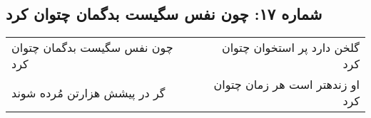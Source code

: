 \begin{center}
\section*{شماره ۱۷: چون نفس سگیست بدگمان چتوان کرد}
\label{sec:017}
\begin{longtable}{l p{0.5cm} r}
چون نفس سگیست بدگمان چتوان کرد
&&
گلخن دارد پر استخوان چتوان کرد
\\
گر در پیشش هزارتن مُرده شوند
&&
او زندهتر است هر زمان چتوان کرد
\\
\end{longtable}
\end{center}
